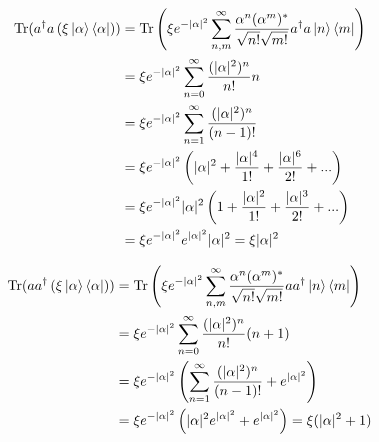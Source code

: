 \documentclass[a4paper, twocolumn, superscriptaddress,prl]{revtex4}  %
\begin{document}
\begin{align*}
\mathrm{Tr}(a^{\dagger}a \left(\xi \ket{\alpha}\bra{\alpha}\right)) &= \mathrm{Tr}\left(\xi e^{-\lvert\alpha\rvert^{2}}\sum_{n,m}^{\infty}\frac{\alpha^{n}(\alpha^{m})^{*}}{\sqrt{n!}\sqrt{m!}}a^{\dagger}a\ket{n}\bra{m} \right)\\
&= \xi e^{-\lvert\alpha\rvert^{2}}\sum_{n=0}^{\infty}\frac{(\lvert\alpha\rvert^{2})^{n}}{n!}n\\
&= \xi e^{-\lvert\alpha\rvert^{2}}\sum_{n=1}^{\infty}\frac{(\lvert\alpha\rvert^{2})^{n}}{(n-1)!}\\
&= \xi e^{-\lvert\alpha\rvert^{2}}\left(\lvert\alpha\rvert^{2} + \frac{\lvert\alpha\rvert^{4}}{1!} + \frac{\lvert\alpha\rvert^{6}}{2!}+...\right)\\
&= \xi e^{-\lvert\alpha\rvert^{2}}\lvert\alpha\rvert^{2}\left(1 + \frac{\lvert\alpha\rvert^{2}}{1!} + \frac{\lvert\alpha\rvert^{3}}{2!}+...\right)\\
&= \xi e^{-\lvert\alpha\rvert^{2}}e^{\lvert\alpha\rvert^{2}}\lvert\alpha\rvert^{2} = \xi\lvert\alpha\rvert^{2}
\end{align*}

\begin{align*}
\mathrm{Tr}(a a^{\dagger} \left(\xi \ket{\alpha}\bra{\alpha}\right)) &= \mathrm{Tr}\left(\xi e^{-\lvert\alpha\rvert^{2}}\sum_{n,m}^{\infty}\frac{\alpha^{n}(\alpha^{m})^{*}}{\sqrt{n!}\sqrt{m!}}a a^{\dagger}\ket{n}\bra{m} \right)\\
&= \xi e^{-\lvert\alpha\rvert^{2}}\sum_{n=0}^{\infty}\frac{(\lvert\alpha\rvert^{2})^{n}}{n!}(n+1)\\
&= \xi e^{-\lvert\alpha\rvert^{2}}\left(\sum_{n=1}^{\infty}\frac{(\lvert\alpha\rvert^{2})^{n}}{(n-1)!} + e^{\lvert\alpha\rvert^{2}}\right)\\
&= \xi e^{-\lvert\alpha\rvert^{2}}\left(\lvert\alpha\rvert^{2}e^{\lvert\alpha\rvert^{2}} + e^{\lvert\alpha\rvert^{2}}\right) = \xi(\lvert\alpha\rvert^{2} + 1)
\end{align*}
\end{document}

